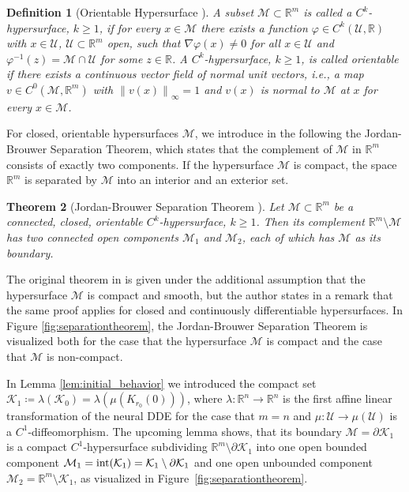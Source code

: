 \documentclass[10pt]{article}
\numberwithin{equation}{section}
\newtheorem{theorem}{Theorem}[section]
\newtheorem{definition}[theorem]{Definition}
\newcommand\norm[1]{\left\lVert#1\right\rVert}
\begin{document}
	\begin{definition}[Orientable Hypersurface \cite{Lima1988}]\label{def:hypersurface}
		A subset $\mathcal{M} \subset \mathbb{R}^m$ is called a $C^k$-hypersurface, $k \geq 1$, if for every $x \in \mathcal{M}$ there exists a function $\varphi \in C^k(\mathcal{U},\mathbb{R})$ with $x \in \mathcal{U}$, $\mathcal{U} \subset \mathbb{R}^m$ open, such that $\nabla \varphi (x) \neq 0$ for all $x \in \mathcal{U}$ and $\varphi^{-1}(z) = \mathcal{M} \cap \mathcal{U}$ for some $z \in \mathbb{R}$. A $C^k$-hypersurface, $k \geq 1$, is called orientable if there exists a continuous vector field of normal unit vectors, i.e., a map $v\in C^0(\mathcal{M},\mathbb{R}^m)$ with $\norm{v(x)}_\infty = 1$ and $v(x)$ is normal to $\mathcal{M}$ at $x$ for every $x \in \mathcal{M}$.
	\end{definition}
	
	For closed, orientable hypersurfaces $\mathcal{M}$, we introduce in the following the Jordan-Brouwer Separation Theorem, which states that the complement of $\mathcal{M}$ in $\mathbb{R}^m$ consists of exactly two components. If the hypersurface $\mathcal{M}$ is compact, the space $\mathbb{R}^m$ is separated by $\mathcal{M}$ into an interior and an exterior set.
	
	\begin{theorem}[Jordan-Brouwer Separation Theorem \cite{Lima1988}] \label{th:JordanBrouwer}
		Let $\mathcal{M}\subset \mathbb{R}^m$ be a connected, closed, orientable $C^k$-hypersurface, $k\geq 1$. Then its complement $\mathbb{R}^m\setminus\mathcal{M}$ has two connected open components $\mathcal{M}_1$ and $\mathcal{M}_2$, each of which has $\mathcal{M}$ as its boundary. 
	\end{theorem}
	
	
	The original theorem in \cite{Lima1988} is given under the additional assumption that the hypersurface $\mathcal{M}$ is compact and smooth, but the author states in a remark that the same proof applies for closed and continuously differentiable hypersurfaces. In Figure \ref{fig:separationtheorem}, the Jordan-Brouwer Separation Theorem is visualized both for the case that the hypersurface $\mathcal{M}$ is compact and the case that $\mathcal{M}$ is non-compact.
	

	In Lemma \ref{lem:initial_behavior} we introduced the compact set $\mathcal{K}_1 \coloneqq \lambda(\mathcal{K}_0) = \lambda(\mu(K_{r_0}(0))) $, where $\lambda:\mathbb{R}^n\rightarrow \mathbb{R}^n$ is the first affine linear transformation of the neural DDE for the case that $m = n$ and $\mu:\mathcal{U}\rightarrow \mu(\mathcal{U})$ is a $C^1$-diffeomorphism. The upcoming lemma shows, that its boundary $\mathcal{M} = \partial \mathcal{K}_1$ is a compact $C^1$-hypersurface subdividing $\mathbb{R}^m\setminus\partial \mathcal{K}_1$ into one open bounded component $\mathcal{M}_1 = \textup{int}(\mathcal{K}_1) = \mathcal{K}_1\setminus \partial \mathcal{K}_1$ and one open unbounded component $\mathcal{M}_2 = \mathbb{R}^m\setminus \mathcal{K}_1$, as visualized in Figure~\ref{fig:separationtheorem}.
	
\end{document}
